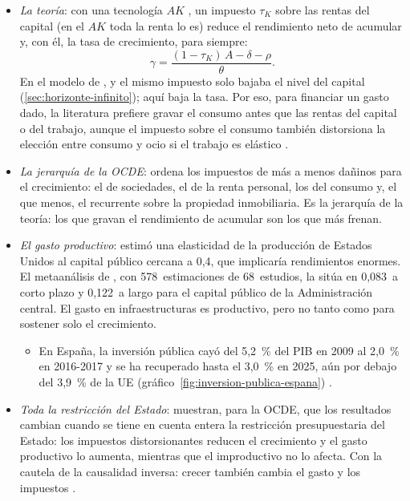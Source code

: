 \documentclass[11pt]{article}
\begin{document}
\begin{itemize}
\item \emph{La teoría}: con una tecnología $AK$\nocite{Rebelo1991Long} , un impuesto $\tau_K$ sobre las rentas del capital (en el $AK$ toda la renta lo es) reduce el rendimiento neto de acumular y, con él, la tasa de crecimiento, para siempre:
  \begin{equation}\label{eq:rebelo}
  \gamma=\frac{(1-\tau_K)\,A-\delta-\rho}{\theta}.
  \end{equation}
  En el modelo de ,  y  el mismo impuesto solo bajaba el nivel del capital (\ref{sec:horizonte-infinito}); aquí baja la tasa. Por eso, para financiar un gasto dado, la literatura prefiere gravar el consumo antes que las rentas del capital o del trabajo, aunque el impuesto sobre el consumo también distorsiona la elección entre consumo y ocio si el trabajo es elástico .
\item \emph{La jerarquía de la OCDE}: ordena los impuestos de más a menos dañinos para el crecimiento: el de sociedades, el de la renta personal, los del consumo y, el que menos, el recurrente sobre la propiedad inmobiliaria\nocite{JohanssonEtAl2008Taxation,Arnold2011Tax}. Es la jerarquía de la teoría: los que gravan el rendimiento de acumular son los que más frenan.
\item \emph{El gasto productivo}: \textcite{Aschauer1989Public} estimó una elasticidad de la producción de Estados Unidos al capital público cercana a 0,4, que implicaría rendimientos enormes. El metaanálisis de \textcite{BomLigthart2014What}, con 578~estimaciones de 68~estudios, la sitúa en 0,083~a corto plazo y 0,122~a largo para el capital público de la Administración central. El gasto en infraestructuras es productivo, pero no tanto como para sostener solo el crecimiento.
  \begin{itemize}
  \item En España, la inversión pública cayó del 5,2~\% del PIB en 2009 al 2,0~\% en 2016-2017 y se ha recuperado hasta el 3,0~\% en 2025, aún por debajo del 3,9~\% de la UE\nocite{Eurostat2026GovMain} (gráfico~\ref{fig:inversion-publica-espana}) .
  \end{itemize}
\item \emph{Toda la restricción del Estado}: \textcite{KnellerBleaneyGemmell1999} muestran, para la OCDE, que los resultados cambian cuando se tiene en cuenta entera la restricción presupuestaria del Estado: los impuestos distorsionantes reducen el crecimiento y el gasto productivo lo aumenta, mientras que el improductivo no lo afecta. Con la cautela de la causalidad inversa: crecer también cambia el gasto y los impuestos .

\end{itemize}
\end{document}
